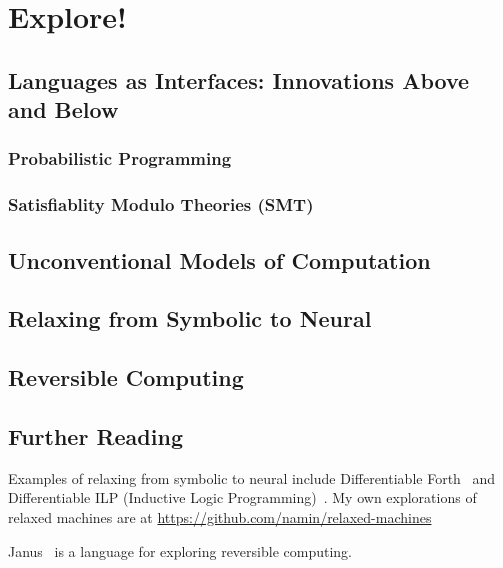 \chapter{Explore!}

\section{Languages as Interfaces: Innovations Above and Below}
\subsection{Probabilistic Programming}
\subsection{Satisfiablity Modulo Theories (SMT)}

\section{Unconventional Models of Computation}

\section{Relaxing from Symbolic to Neural}

\section{Reversible Computing}

\section{Further Reading}

Examples of relaxing from symbolic to neural include Differentiable Forth~\citep{diffForth} and Differentiable ILP (Inductive Logic Programming)~\citep{diffILP}.
My own explorations of relaxed machines are at \url{https://github.com/namin/relaxed-machines}

Janus~\citep{janus} is a language for exploring reversible computing.
